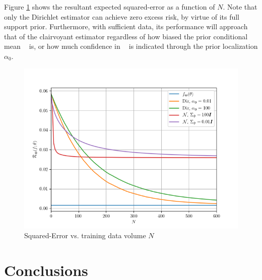 \documentclass{article}
\DeclareMathOperator{\Bi}{\mathrm{Bi}}
\DeclareMathOperator{\alphac}{\alpha_\text{c}}
\begin{document}
Figure \ref{fig:Risk_cond_SE_N_biased_hard} shows the resultant expected squared-error as a function of $N$. Note that only the Dirichlet estimator can achieve zero excess risk, by virtue of its full support prior. Furthermore, with sufficient data, its performance will approach that of the clairvoyant estimator regardless of how biased the prior conditional mean $\alphac$ is, or how much confidence in $\alphac$ is indicated through the prior localization $\alpha_0$.
\begin{figure}
\centering
\includegraphics[width=1\linewidth]{SSP_2021/Risk_cond_SE_N_biased_hard.png}
\caption{Squared-Error vs. training data volume $N$}
\label{fig:Risk_cond_SE_N_biased_hard}
\end{figure}










\section{Conclusions}
\end{document}
